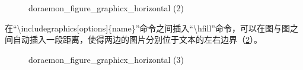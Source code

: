 \documentclass{article}
\begin{document}
    \begin{figure}[htbp]
        \centering
        \caption{doraemon\_figure\_graphicx\_horizontal (2)}
        \label{2}
    \end{figure}

    在``\textbackslash includegraphics[options]\{name\}''命令之间插入``\textbackslash hfill''命令，可以在图与图之间自动插入一段距离，使得两边的图片分别位于文本的左右边界（\ref{3}）。

    \begin{figure}[htbp]
        \centering
        \hfill
        \hfill
        \caption{doraemon\_figure\_graphicx\_horizontal (3)}
        \label{3}
    \end{figure}
\end{document}
